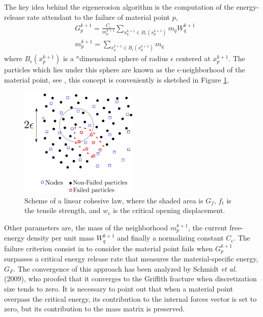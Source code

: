 \documentclass[preprint,12pt,a4paper]{elsarticle}
\begin{document}
The key idea behind the eigenerosion algorithm is the computation of the
energy-release rate attendant to the failure of material point $p$,
\begin{align}
  \label{eq:energy-release-EE}
&G_p^{k+1} = \frac{C_{\epsilon}}{m_p^{k+1}}  \sum_{x_q^{k+1} \in
  B_{\epsilon}(x_p^{k+1})} m_q W_q^{k+1}\\
&m_p^{k+1} =  \sum_{x_q^{k+1} \in
  B_{\epsilon}(x_p^{k+1})} m_q  
\end{align}
where $B_{\epsilon}(x_p^{k+1})$ is a $^n$dimensional sphere of radius $\epsilon$
centered at $x_p^{k+1}$. The particles which lies under this sphere are
known as the $\epsilon$-neighborhood of the material point, see
\cite{Pandolfi_2012}, this concept is conveniently is sketched in
Figure \ref{fig:Failed-particles}.
\begin{figure}
  \centering
  \includegraphics[width=0.5\textwidth]{Figure-Particle-failed}
  \caption{Scheme of a linear cohesive law, where the shaded area is
    $G_f$, $f_t$ is the tensile strength, and $w_c$ is the critical
    opening displacement.}
  \label{fig:Failed-particles}
\end{figure}
Other parameters are, the mass of the neighborhood $m_p^{k+1}$, the
current free-energy density per unit mass  $W_q^{k+1}$ and finally a
normalizing constant $C_{\epsilon}$. 
The failure criterion consist in to consider the material point fails
when $G_p^{k+1}$ surpasses a critical energy release rate that
measures the material-specific energy, $G_F$. The convergence of this
approach has been analyzed by Schmidt {\it et al.}
(2009)\cite{Schmidt_2009}, who proofed that it converges to the Griffith
fracture when discretization size tends to zero. It is necessary to
point out that when a material point overpass the critical energy, its
contribution to the internal forces vector is set to zero, but its
contribution to the mass matrix is preserved.\\
\end{document}
